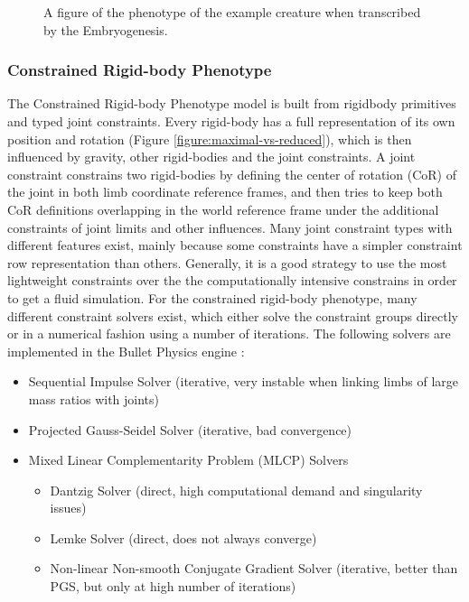 \documentclass[main]{subfiles}
\begin{document}
\begin{figure}[H]
\centering


\caption[A figure of the phenotype]{A figure of the phenotype of the example creature when transcribed by the Embryogenesis.}
\label{figure:direct-encoding}
\end{figure}

\subsubsection{Constrained Rigid-body Phenotype}

The Constrained Rigid-body Phenotype model is built from rigidbody primitives and typed joint constraints. %
%
Every rigid-body has a full representation of its own position and rotation (Figure \ref{figure:maximal-vs-reduced}), which is then influenced by gravity, other rigid-bodies and the joint constraints. %
%
A joint constraint constrains two rigid-bodies by defining the center of rotation (CoR) of the joint in both limb coordinate reference frames, and then tries to keep both CoR definitions overlapping in the world reference frame under the additional constraints of joint limits and other influences.  %
%
Many joint constraint types with different features exist, mainly because some constraints have a simpler constraint row representation than others. %
%
Generally, it is a good strategy to use the most lightweight constraints over the the computationally intensive constrains in order to get a fluid simulation. %
%
For the constrained rigid-body phenotype, many different constraint solvers exist, which either solve the constraint groups directly or in a numerical fashion using a number of iterations. %
%
The following solvers are implemented in the Bullet Physics engine \cite{bib::Coumans2014}: 


\begin{itemize}
\item Sequential Impulse Solver (iterative, very instable when linking limbs of large mass ratios with joints) \\ 
\item Projected Gauss-Seidel Solver (iterative, bad convergence) \\
\item Mixed Linear Complementarity Problem (MLCP) Solvers
\begin{itemize}
\item Dantzig Solver (direct, high computational demand and singularity issues)
\item Lemke Solver (direct, does not always converge)
\item Non-linear Non-smooth Conjugate Gradient Solver (iterative, better than PGS, but only at high number of iterations)
\end{itemize}
\end{itemize}
\end{document}
